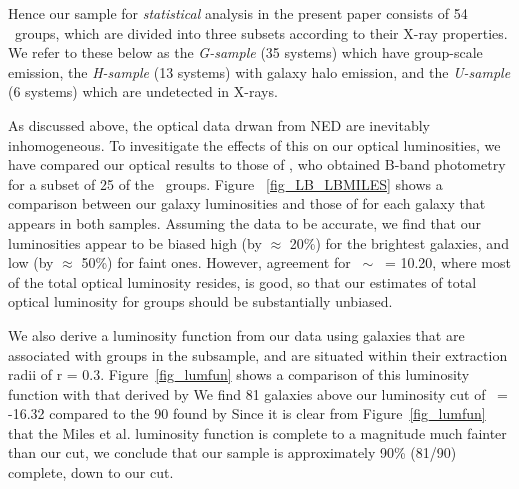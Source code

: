 \documentclass[usenatbib]{mn2e}
\begin{document}
Hence our sample for {\it statistical} analysis in the present paper consists of
54 \GEMS\ groups, which are divided into three subsets according to their X-ray
properties. We refer to these below as the {\it G-sample} (35 systems) which
have group-scale emission, the {\it H-sample} (13 systems) with galaxy halo
emission, and the {\it U-sample} (6 systems) which are undetected in X-rays.

As discussed above, the optical data drwan from NED are inevitably inhomogeneous.
To invesitigate the effects of this on our optical luminosities, we have compared
our optical results to those of \citet{miles04}, who obtained B-band photometry
for a subset of 25 of the \GEMS\ groups.  Figure~ \ref{fig_LB_LBMILES} shows a
comparison between our galaxy luminosities and those of \citeauthor{miles04} for
each galaxy that appears in both samples.  Assuming the \citeauthor{miles04} data
to be accurate, we find that our luminosities appear to be biased high (by
$\approx$ 20\%) for the brightest galaxies, and low (by $\approx$ 50\%) for faint
ones.  However, agreement for \LB\ $\sim$ \Lstar\ = 10.20, where most of the total
optical luminosity resides, is good, so that our estimates of total optical
luminosity for groups should be substantially unbiased.

We also derive a luminosity function from our data using galaxies that are
associated with groups in the \citeauthor{miles04} subsample, and are situated
within their extraction radii of r = 0.3\rfh.  Figure~\ref{fig_lumfun} shows a
comparison of this luminosity function with that derived by \citeauthor{miles04}
We find 81 galaxies above our luminosity cut of \MB\ = -16.32 compared to the 90
found by \citeauthor{miles04}  Since it is clear from Figure~\ref{fig_lumfun}
that the Miles et al. luminosity function is complete to a magnitude much fainter
than our cut, we conclude that our sample is approximately 90\% (81/90) complete,
down to our cut.
\end{document}
